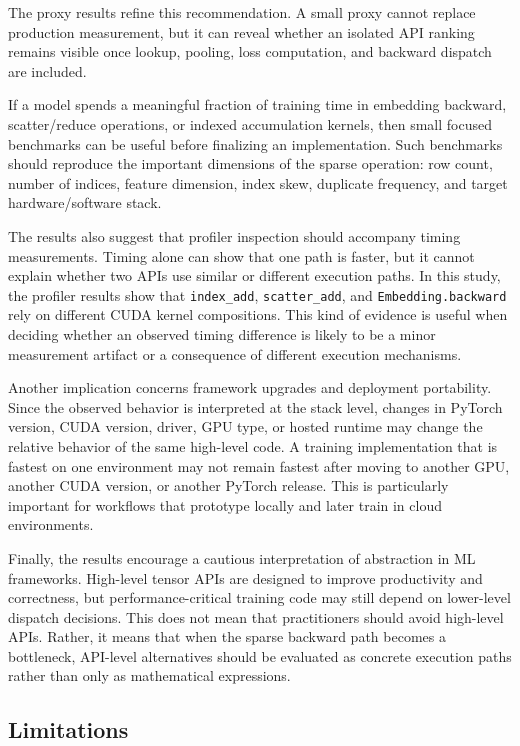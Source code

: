 The proxy results refine this recommendation. A small proxy cannot replace production measurement, but it can reveal whether an isolated API ranking remains visible once lookup, pooling, loss computation, and backward dispatch are included.

If a model spends a meaningful fraction of training time in embedding backward, scatter/reduce operations, or indexed accumulation kernels, then small focused benchmarks can be useful before finalizing an implementation. Such benchmarks should reproduce the important dimensions of the sparse operation: row count, number of indices, feature dimension, index skew, duplicate frequency, and target hardware/software stack.

The results also suggest that profiler inspection should accompany timing measurements. Timing alone can show that one path is faster, but it cannot explain whether two APIs use similar or different execution paths. In this study, the profiler results show that \texttt{index\_\allowbreak add}, \texttt{scatter\_\allowbreak add}, and \texttt{Embedding.\allowbreak backward} rely on different CUDA kernel compositions. This kind of evidence is useful when deciding whether an observed timing difference is likely to be a minor measurement artifact or a consequence of different execution mechanisms.

Another implication concerns framework upgrades and deployment portability. Since the observed behavior is interpreted at the stack level, changes in PyTorch version, CUDA version, driver, GPU type, or hosted runtime may change the relative behavior of the same high-level code. A training implementation that is fastest on one environment may not remain fastest after moving to another GPU, another CUDA version, or another PyTorch release. This is particularly important for workflows that prototype locally and later train in cloud environments.

Finally, the results encourage a cautious interpretation of abstraction in ML frameworks. High-level tensor APIs are designed to improve productivity and correctness, but performance-critical training code may still depend on lower-level dispatch decisions. This does not mean that practitioners should avoid high-level APIs. Rather, it means that when the sparse backward path becomes a bottleneck, API-level alternatives should be evaluated as concrete execution paths rather than only as mathematical expressions.

\subsection{Limitations}

